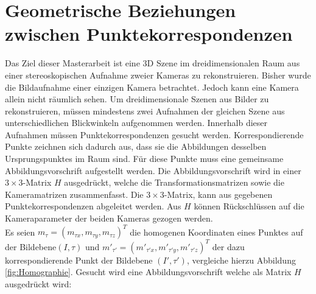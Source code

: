 \chapter{Geometrische Beziehungen zwischen Punktekorrespondenzen}
\label{sec:HFE}

Das Ziel dieser Masterarbeit ist eine 3D Szene im dreidimensionalen Raum aus einer stereoskopischen Aufnahme zweier Kameras zu rekonstruieren. Bisher wurde die Bildaufnahme einer einzigen Kamera betrachtet. Jedoch kann eine Kamera allein nicht räumlich sehen. Um dreidimensionale Szenen aus Bilder zu rekonstruieren, müssen mindestens zwei Aufnahmen der gleichen Szene aus unterschiedlichen Blickwinkeln aufgenommen werden. Innerhalb dieser Aufnahmen müssen Punktekorrespondenzen gesucht werden. Korrespondierende Punkte zeichnen sich dadurch aus, dass sie die Abbildungen desselben Ursprungspunktes im Raum sind. Für diese Punkte muss eine gemeinsame Abbildungsvorschrift aufgestellt werden. Die Abbildungsvorschrift wird in einer $3 \times 3$-Matrix $H$ ausgedrückt, welche die Transformationsmatrizen sowie die Kameramatrizen zusammenfasst. Die $3 \times 3$-Matrix, kann aus gegebenen Punktekorrespondenzen abgeleitet werden. Aus $H$ können Rückschlüssen auf die Kameraparameter der beiden Kameras gezogen werden.  \\


%

Es seien \ensuremath{m_{\tau} =(m_{\tau x},m_{\tau y},m_{\tau z})^T} die homogenen Koordinaten eines Punktes auf der Bildebene$(I,\tau)$ und \ensuremath{m'_{\tau'} = (m'_{\tau'x},m'_{\tau'y},m'_{\tau'z})^T} der dazu korrespondierende Punkt der Bildebene $(I',\tau')$, vergleiche hierzu Abbildung \ref{fig:Homographie}. Gesucht wird eine Abbildungsvorschrift welche als Matrix $H$ ausgedrückt wird:

